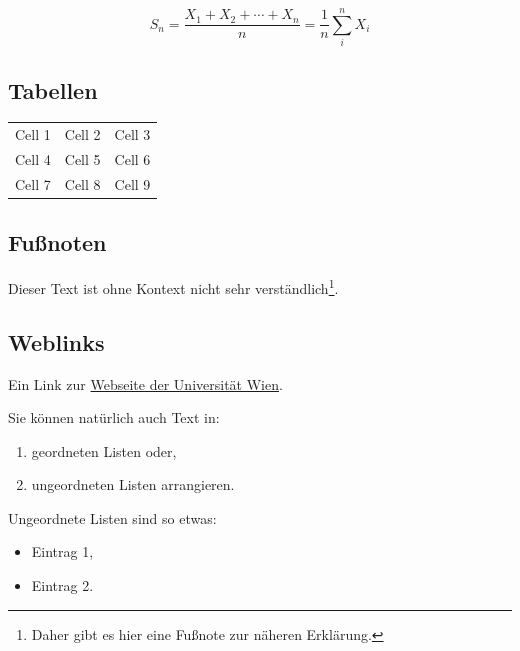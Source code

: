 \documentclass[a4paper, 11pt]{article}         %
\begin{document}
    \[S_n = \frac{X_1 + X_2 + \cdots + X_n}{n}
          = \frac{1}{n}\sum_{i}^{n} X_i\]

\subsection{Tabellen}                           %

\begin{center}
\begin{tabular}{ |c|c|c| } 
    \hline
    Cell 1 & Cell 2 & Cell 3 \\ 
    Cell 4 & Cell 5 & Cell 6 \\ 
    Cell 7 & Cell 8 & Cell 9 \\ 
    \hline
\end{tabular}
\end{center}

\subsection{Fußnoten}                           %

    Dieser Text ist ohne Kontext nicht sehr verständlich\footnote{Daher gibt es hier eine Fußnote zur näheren Erklärung.}.

    \lipsum[1-1]

\subsection{Weblinks}                           %

    Ein Link zur \hyperlink{https://www.univie.ac.at}{Webseite der Universität Wien}.
    \lipsum[1-1]

    Sie können natürlich auch Text in:
    \begin{enumerate}
    \item geordneten Listen oder,
    \item ungeordneten Listen arrangieren.
    \end{enumerate}

    Ungeordnete Listen sind so etwas:
    \begin{itemize}
    \item Eintrag 1,
    \item Eintrag 2.
    \end{itemize}
    
    \lipsum[1-1]

\printbibliography[heading=bibintoc]

\end{document}
